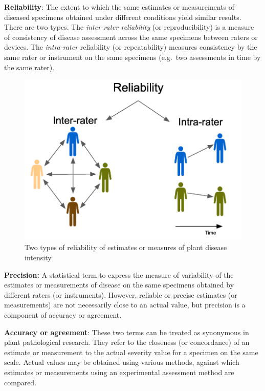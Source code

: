 \documentclass[
  letterpaper,
  DIV=11,
  numbers=noendperiod]{scrreprt}
\begin{document}
\textbf{Reliability}: The extent to which the same estimates or
measurements of diseased specimens obtained under different conditions
yield similar results. There are two types. The \emph{inter-rater
reliability} (or reproducibility) is a measure of consistency of disease
assessment across the same specimens between raters or devices. The
\emph{intra-rater} reliability (or repeatability) measures consistency
by the same rater or instrument on the same specimens (e.g.~two
assessments in time by the same rater).

\begin{figure}

{\centering \includegraphics[width=5.26042in,height=\textheight]{./imgs/reliability.png}

}

\caption{\label{fig-reliability.png}Two types of reliability of
estimates or measures of plant disease intensity}

\end{figure}

\textbf{Precision:} A statistical term to express the measure of
variability of the estimates or measurements of disease on the same
specimens obtained by different raters (or instruments). However,
reliable or precise estimates (or measurements) are not necessarily
close to an actual value, but precision is a component of accuracy or
agreement.

\textbf{Accuracy or agreement}: These two terms can be treated as
synonymous in plant pathological research. They refer to the closeness
(or concordance) of an estimate or measurement to the actual severity
value for a specimen on the same scale. Actual values may be obtained
using various methods, against which estimates or measurements using an
experimental assessment method are compared.
\end{document}
